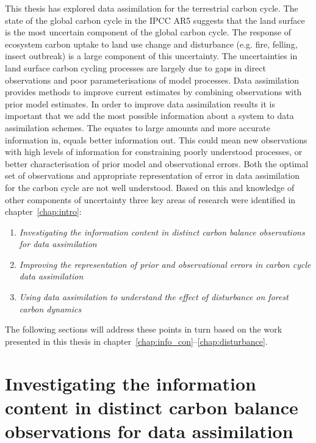 
This thesis has explored data assimilation for the terrestrial carbon cycle. The state of the global carbon cycle in the IPCC AR5 suggests that the land surface is the most uncertain component of the global carbon cycle. The response of ecosystem carbon uptake to land use change and disturbance (e.g. fire, felling, insect outbreak) is a large component of this uncertainty. The uncertainties in land surface carbon cycling processes are largely due to gaps in direct observations and poor parameterisations of model processes. Data assimilation provides methods to improve current estimates by combining observations with prior model estimates. In order to improve data assimilation results it is important that we add the most possible information about a system to data assimilation schemes. The equates to large amounts and more accurate information in, equals better information out. This could mean new observations with high levels of information for constraining poorly understood processes, or better characterisation of prior model and observational errors. Both the optimal set of observations and appropriate representation of error in data assimilation for the carbon cycle are not well understood. Based on this and knowledge of other components of uncertainty three key areas of research were identified in chapter~\ref{chap:intro}:
\begin{enumerate}
\item \textit{Investigating the information content in distinct carbon balance observations for data assimilation}

\item \textit{Improving the representation of prior and observational errors in carbon cycle data assimilation}

\item \textit{Using data assimilation to understand the effect of disturbance on forest carbon dynamics}
\end{enumerate}
The following sections will address these points in turn based on the work presented in this thesis in chapter~\ref{chap:info_con}--\ref{chap:disturbance}.

\section{Investigating the information content in distinct carbon balance observations for data assimilation}

